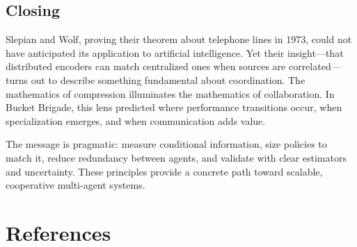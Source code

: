 \documentclass[10pt, letterpaper]{article}
\begin{document}
\subsection*{Closing}

Slepian and Wolf, proving their theorem about telephone lines in 1973, could not have anticipated its application to artificial intelligence. Yet their insight---that distributed encoders can match centralized ones when sources are correlated---turns out to describe something fundamental about coordination. The mathematics of compression illuminates the mathematics of collaboration. In Bucket Brigade, this lens predicted where performance transitions occur, when specialization emerges, and when communication adds value.

The message is pragmatic: measure conditional information, size policies to match it, reduce redundancy between agents, and validate with clear estimators and uncertainty. These principles provide a concrete path toward scalable, cooperative multi-agent systems.

\section*{References}
\end{document}
